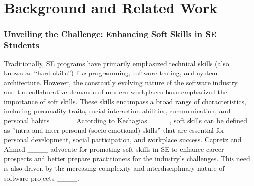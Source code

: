\section{Background and Related Work}


\subsubsection{Unveiling the Challenge: Enhancing Soft Skills in SE Students}

Traditionally, SE programs have primarily emphasized technical skills (also known as ``hard skills'') like programming, software testing, and system architecture. However, the constantly evolving nature of the software industry and the collaborative demands of modern workplaces have emphasized the importance of soft skills. These skills encompass a broad range of characteristics, including personality traits, social interaction abilities, communication, and personal habits ____. According to Kechagias ____, soft skills can be defined as ``intra and inter personal (socio-emotional) skills'' that are essential for personal development, social participation, and workplace success. Capretz and Ahmed ____ advocate for promoting soft skills in SE to enhance career prospects and better prepare practitioners for the industry's challenges. This need is also driven by the increasing complexity and interdisciplinary nature of software projects ____.





